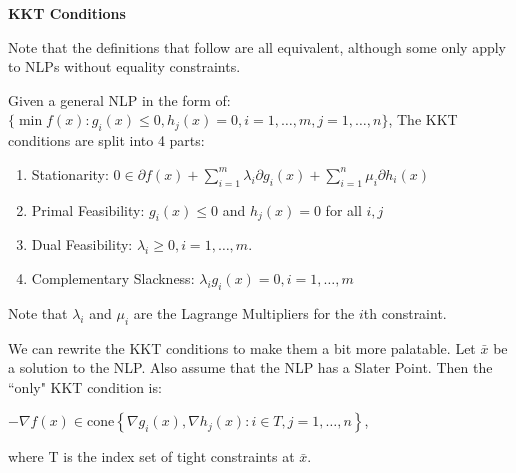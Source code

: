 \documentclass[a4paper]{report}
\begin{document}
	\begin{definition*}
		\textbf{KKT Conditions} \\ \item Note that the definitions that follow are
		all equivalent, although some only apply to NLPs without equality constraints.
		\item
		\begin{definition}
			\label{kkt} Given a general NLP in the form of: \\
			$\{\min f(x) : g_{i}(x) \leq 0, h_{j}(x) = 0, i = 1, \dots, m, j = 1, \dots
			, n\}$, The KKT conditions are split into 4 parts:
			\begin{enumerate}
				\item Stationarity:
					$0 \in \partial f(x) + \sum_{i=1}^{m} \lambda_{i} \partial g_{i}(x) + \sum
					_{i=1}^{n} \mu_{i} \partial h_{i}(x)$

				\item Primal Feasibility: $g_{i}(x) \leq 0$ and $h_{j}(x) = 0$ for all
					$i,j$

				\item Dual Feasibility: $\lambda_{i} \geq 0, i = 1, \dots, m$.

				\item Complementary Slackness:
					$\lambda_{i} g_{i}(x) = 0, i = 1, \dots, m$
			\end{enumerate}

			Note that $\lambda_{i}$ and $\mu_{i}$ are the Lagrange Multipliers for the
			$i$th constraint.
		\end{definition}


		\item
		\begin{definition}
			\label{kkt2} We can rewrite the KKT conditions to make them a bit more palatable.
			Let $\bar x$ be a solution to the NLP. Also assume that the NLP has a Slater
			Point. Then the ``only" KKT condition is:
			\begin{center}
				$-\nabla f(x) \in \text{cone}\left\{ \nabla g_{i}(x), \nabla h_{j}(x) : i
				\in T, j = 1, \dots, n \right\}$,
			\end{center}
			where T is the index set of tight constraints at $\bar x$.
		\end{definition}


\end{definition*}
\end{document}
